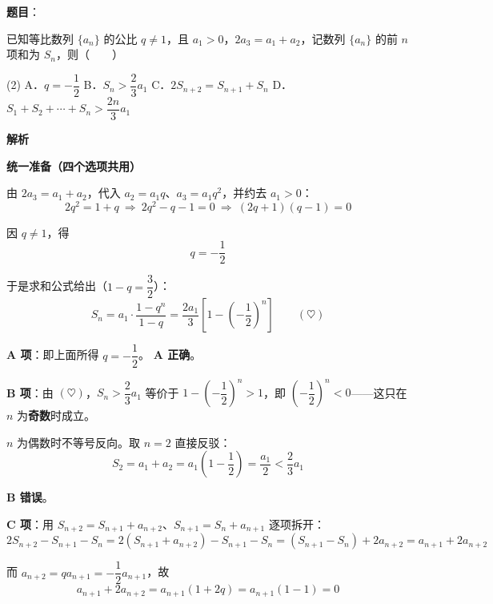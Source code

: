 \begin{answer}

\textbf{题目}：

已知等比数列 $\{a_n\}$ 的公比 $q\ne1$，且 $a_1>0$，$2a_3=a_1+a_2$，记数列 $\{a_n\}$ 的前 $n$ 项和为 $S_n$，则\mbox{（　　）}

\begin{gkopts}(2)
\task A．$q=-\dfrac{1}{2}$
\task B．$S_n>\dfrac{2}{3}a_1$
\task C．$2S_{n+2}=S_{n+1}+S_n$
\task D．$S_1+S_2+\cdots+S_n>\dfrac{2n}{3}a_1$
\end{gkopts}

\textbf{解析}

\textbf{统一准备（四个选项共用）}

由 $2a_3=a_1+a_2$，代入 $a_2=a_1q$、$a_3=a_1q^2$，并约去 $a_1>0$：
\nopagebreak[4]
\[2q^2=1+q\ \Longrightarrow\ 2q^2-q-1=0\ \Longrightarrow\ (2q+1)(q-1)=0\]

因 $q\ne1$，得
\nopagebreak[4]
\[q=-\frac12\]

于是求和公式给出（$1-q=\dfrac32$）：
\nopagebreak[4]
\[S_n=a_1\cdot\frac{1-q^n}{1-q}=\frac{2a_1}{3}\left[1-\left(-\frac12\right)^n\right]\qquad(\heartsuit)\]

\par\medskip

\textbf{A 项}：即上面所得 $q=-\dfrac12$。 \textbf{A 正确}。

\par\medskip

\textbf{B 项}：由 $(\heartsuit)$，$S_n>\dfrac23a_1$ 等价于 $1-\left(-\dfrac12\right)^n>1$，即 $\left(-\dfrac12\right)^n<0$——这只在 $n$ 为\textbf{奇数}时成立。

$n$ 为偶数时不等号反向。取 $n=2$ 直接反驳：
\nopagebreak[4]
\[S_2=a_1+a_2=a_1\left(1-\frac12\right)=\frac{a_1}{2}<\frac23a_1\]

 \textbf{B 错误}。

\par\medskip

\textbf{C 项}：用 $S_{n+2}=S_{n+1}+a_{n+2}$、$S_{n+1}=S_n+a_{n+1}$ 逐项拆开：
\nopagebreak[4]
\[2S_{n+2}-S_{n+1}-S_n=2\left(S_{n+1}+a_{n+2}\right)-S_{n+1}-S_n=\left(S_{n+1}-S_n\right)+2a_{n+2}=a_{n+1}+2a_{n+2}\]

而 $a_{n+2}=qa_{n+1}=-\dfrac12a_{n+1}$，故
\nopagebreak[4]
\[a_{n+1}+2a_{n+2}=a_{n+1}(1+2q)=a_{n+1}\left(1-1\right)=0\]


\end{answer}
